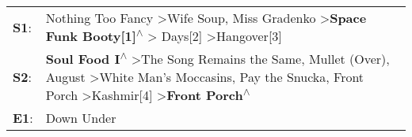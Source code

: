 \begin{supertabular}{p{0.03\textwidth}p{0.92\textwidth}}
 \textbf{S1}:  &                                                                                                                                                     Nothing Too Fancy\textsuperscript{} \textgreater \enspace Wife Soup\textsuperscript{}, \enspace Miss Gradenko\textsuperscript{} \textgreater \enspace \textbf{Space Funk Booty[1]\textsuperscript{$\wedge$}} \textgreater {} Days[2]\textsuperscript{} \textgreater \enspace Hangover[3]\textsuperscript{}  \enspace  \\
 \textbf{S2}:  &  \textbf{Soul Food I\textsuperscript{$\wedge$}} \textgreater \enspace The Song Remains the Same\textsuperscript{}, \enspace Mullet (Over)\textsuperscript{}, \enspace August\textsuperscript{} \textgreater \enspace White Man's Moccasins\textsuperscript{}, \enspace Pay the Snucka\textsuperscript{}, \enspace Front Porch\textsuperscript{} \textgreater \enspace Kashmir[4]\textsuperscript{} \textgreater \enspace \textbf{Front Porch\textsuperscript{$\wedge$}}  \enspace  \\
 \textbf{E1}:  &                                                                                                                                                                                                                                                                                                                                                                                                                                            Down Under\textsuperscript{}  \enspace  \\
\end{supertabular}
